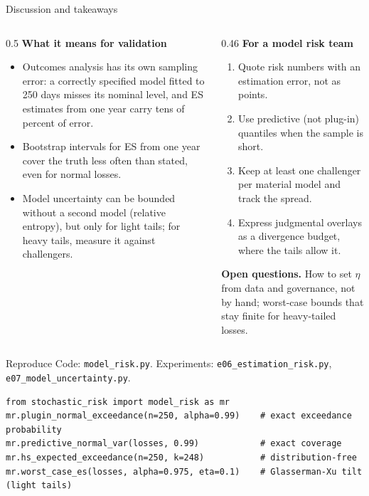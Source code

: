 \documentclass[aspectratio=169,10pt]{beamer}
\begin{document}
\begin{frame}{Discussion and takeaways}
  \small
  \begin{columns}[T]
    \begin{column}{0.5\textwidth}
      \textbf{What it means for validation}
      \begin{itemize}
        \item Outcomes analysis has its own sampling error: a correctly specified model fitted to 250 days misses its nominal level, and ES estimates from one year carry tens of percent of error.
        \item Bootstrap intervals for ES from one year cover the truth less often than stated, even for normal losses.
        \item Model uncertainty can be bounded without a second model (relative entropy), but only for light tails; for heavy tails, measure it against challengers.
      \end{itemize}
    \end{column}
    \begin{column}{0.46\textwidth}
      \textbf{For a model risk team}
      \begin{enumerate}
        \item Quote risk numbers with an estimation error, not as points.
        \item Use predictive (not plug-in) quantiles when the sample is short.
        \item Keep at least one challenger per material model and track the spread.
        \item Express judgmental overlays as a divergence budget, where the tails allow it.
      \end{enumerate}
      \textbf{Open questions.} How to set $\eta$ from data and governance, not by hand; worst-case bounds that stay finite for heavy-tailed losses.
    \end{column}
  \end{columns}
\end{frame}

\begin{frame}[fragile]{Reproduce}
  \small
  Code: \texttt{model\_risk.py}. Experiments: \texttt{e06\_estimation\_risk.py}, \texttt{e07\_model\_uncertainty.py}.
\begin{verbatim}
from stochastic_risk import model_risk as mr
mr.plugin_normal_exceedance(n=250, alpha=0.99)    # exact exceedance probability
mr.predictive_normal_var(losses, 0.99)            # exact coverage
mr.hs_expected_exceedance(n=250, k=248)           # distribution-free
mr.worst_case_es(losses, alpha=0.975, eta=0.1)    # Glasserman-Xu tilt (light tails)
\end{verbatim}
\end{frame}

\deckreferences
\end{document}
